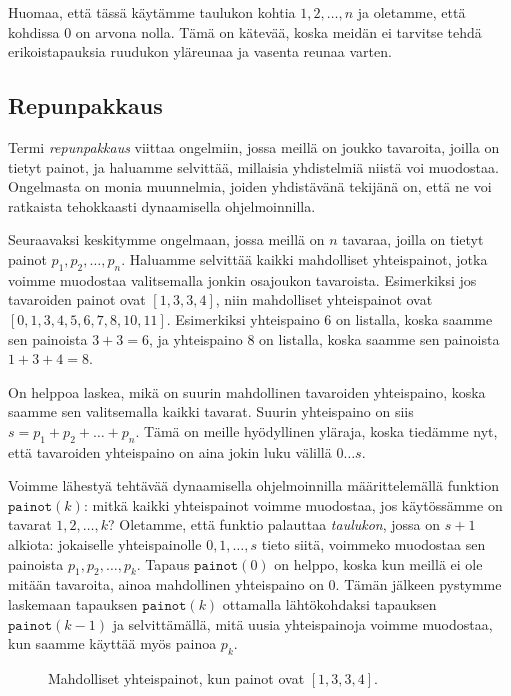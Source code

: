 Huomaa, että tässä käytämme taulukon kohtia $1,2,\dots,n$
ja oletamme, että kohdissa $0$ on arvona nolla.
Tämä on kätevää, koska meidän ei tarvitse tehdä erikoistapauksia
ruudukon yläreunaa ja vasenta reunaa varten.

\subsection{Repunpakkaus}

Termi \emph{repunpakkaus} viittaa ongelmiin, jossa meillä on joukko
tavaroita, joilla on tietyt painot, 
ja haluamme selvittää, millaisia yhdistelmiä niistä voi muodostaa.
Ongelmasta on monia muunnelmia, joiden yhdistävänä tekijänä on,
että ne voi ratkaista tehokkaasti dynaamisella ohjelmoinnilla.

Seuraavaksi keskitymme ongelmaan, jossa meillä on $n$ tavaraa,
joilla on tietyt painot $p_1,p_2,\dots,p_n$.
Haluamme selvittää kaikki mahdolliset yhteispainot,
jotka voimme muodostaa valitsemalla jonkin osajoukon tavaroista.
Esimerkiksi jos tavaroiden painot ovat $[1,3,3,4]$,
niin mahdolliset yhteispainot ovat $[0,1,3,4,5,6,7,8,10,11]$.
Esimerkiksi yhteispaino $6$ on listalla,
koska saamme sen painoista $3+3=6$,
ja yhteispaino $8$ on listalla,
koska saamme sen painoista $1+3+4=8$.

On helppoa laskea, mikä on suurin mahdollinen tavaroiden yhteispaino,
koska saamme sen valitsemalla kaikki tavarat.
Suurin yhteispaino on siis $s=p_1+p_2+\dots+p_n$.
Tämä on meille hyödyllinen yläraja, koska tiedämme nyt,
että tavaroiden yhteispaino on aina jokin luku välillä $0 \dots s$.

Voimme lähestyä tehtävää dynaamisella ohjelmoinnilla määrittelemällä
funktion $\texttt{painot}(k)$: mitkä kaikki yhteispainot voimme
muodostaa, jos käytös\-sämme on tavarat $1,2,\dots,k$?
Oletamme, että funktio palauttaa \emph{taulukon}, jossa on $s+1$ alkiota:
jokaiselle yhteispainolle $0,1,\dots,s$ tieto siitä,
voimmeko muodostaa sen painoista $p_1,p_2,\dots,p_k$.
Tapaus $\texttt{painot}(0)$ on helppo,
koska kun meillä ei ole mitään tavaroita,
ainoa mahdollinen yhteispaino on $0$.
Tämän jälkeen pystymme laskemaan tapauksen $\texttt{painot}(k)$
ottamalla lähtökohdaksi tapauksen $\texttt{painot}(k-1)$
ja selvittämällä, mitä uusia yhteispainoja voimme muodostaa,
kun saamme käyttää myös painoa $p_k$.

\begin{figure}
\center
{}
\caption{Mahdolliset yhteispainot, kun painot ovat $[1,3,3,4]$.}
\label{fig:reppak}
\end{figure}

